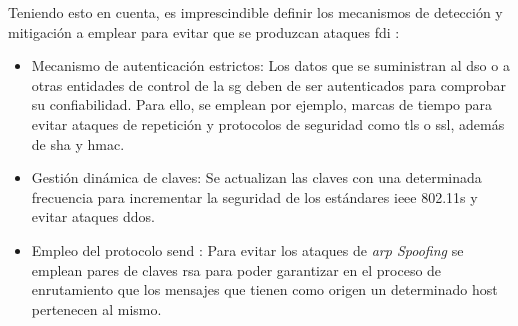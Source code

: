 Teniendo esto en cuenta, es imprescindible definir los mecanismos de detección y mitigación a emplear para evitar que se produzcan ataques \gls{fdi} \cite{baddata}:

\begin{itemize}
  \item Mecanismo de autenticación estrictos: Los datos que se suministran al \gls{dso} o a otras entidades de control de la \gls{sg} deben de ser autenticados para comprobar su confiabilidad. Para ello, se emplean por ejemplo, marcas de tiempo para evitar ataques de repetición y protocolos de seguridad como \gls{tls} o \gls{ssl}, además de \gls{sha} y \gls{hmac}.
  \item Gestión dinámica de claves: Se actualizan las claves con una determinada frecuencia para incrementar la seguridad de los estándares \gls{ieee} 802.11s y evitar ataques \gls{ddos}.
  \item Empleo del protocolo \gls{send} \cite{send}: Para evitar los ataques de \textit{\gls{arp} Spoofing} se emplean pares de claves \gls{rsa} para poder garantizar en el proceso de enrutamiento que los mensajes que tienen como origen un determinado host pertenecen al mismo.
\end{itemize}













